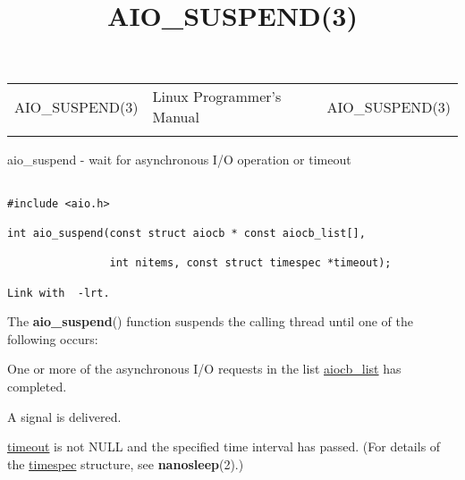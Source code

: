 \documentclass[]{article}
\title{AIO\_SUSPEND(3)}
\author{}
\date{}
\let\realtextbf=\textbf
\renewcommand{\textbf}[1]{\textcolor{boldcolor}{\realtextbf{#1}}}
\renewcommand{\emph}[1]{\underline{#1}}
\begin{document}
\maketitle

\begin{longtable}[c]{@{}lll@{}}
\toprule\addlinespace
AIO\_SUSPEND(3) & Linux Programmer's Manual & AIO\_SUSPEND(3)
\\\addlinespace
\bottomrule
\end{longtable}


aio\_suspend - wait for asynchronous I/O operation or timeout


\begin{verbatim}
 
#include <aio.h>
 
int aio_suspend(const struct aiocb * const aiocb_list[],
 
                int nitems, const struct timespec *timeout);
 
Link with  -lrt.
\end{verbatim}


The \textbf{aio\_suspend}() function suspends the calling thread until
one of the following occurs:

\begin{description}
\itemsep1pt\parskip0pt
\item[*]
One or more of the asynchronous I/O requests in the list
\emph{aiocb\_list} has completed.
\end{description}

\begin{description}
\itemsep1pt\parskip0pt
\item[*]
A signal is delivered.
\end{description}

\begin{description}
\itemsep1pt\parskip0pt
\item[*]
\emph{timeout} is not NULL and the specified time interval has passed.
(For details of the \emph{timespec} structure, see
\textbf{nanosleep}(2).)
\end{description}
\end{document}
